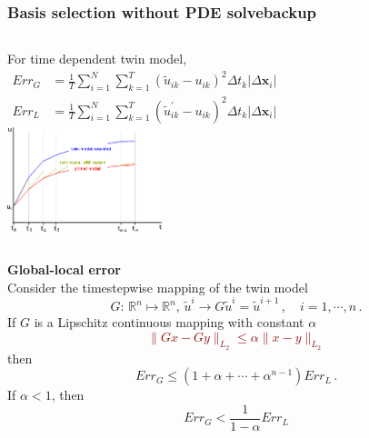 \documentclass{beamer}
\begin{document}
\begin{frame}
    \frametitle{Basis selection without PDE solve\hfill \scriptsize{backup}}\scriptsize
    \begin{columns}
            For time dependent twin model,
            \begin{equation*}\begin{split}
            Err_{G} &= 
            \frac{1}{T}\sum_{i=1}^{N}\sum_{k=1}^{T} \left(\tilde{u}_{ik} - u_{ik}\right)^2 \Delta t_k
            \left| \Delta \mathbf{x}_i \right|\\
            Err_{L} &= 
            \frac{1}{T}\sum_{i=1}^{N}\sum_{k=1}^{T} \left(\tilde{u}^\prime_{ik} - u_{ik}\right)^2 \Delta t_k
            \left| \Delta \mathbf{x}_i \right|
            \end{split}\end{equation*}
            \centering
            \includegraphics[width=4.5cm]{sketch2.png}
    \end{columns}
    \tiny
    \begin{theorem}
    \textbf{Global-local error}\\
    Consider the timestepwise mapping of the twin model
    \begin{equation*}
        G:\, \mathbb{R}^n\mapsto\mathbb{R}^n,\, \tilde{u}^i\rightarrow 
        G\tilde{u}^i = \tilde{u}^{i+1}\,,\quad i=1,\cdots, n\,.
    \end{equation*}
    If $G$ is a Lipschitz continuous mapping with constant $\alpha$
    \textcolor{darkred}{
    \begin{equation*}
        \|Gx-Gy\|_{L_2} \le \alpha \|x-y\|_{L_2}
    \end{equation*}
    }
    then
    \begin{equation*}
        Err_G \le (1+\alpha+\cdots+\alpha^{n-1}) Err_L\,.
    \end{equation*}
    If $\alpha < 1$, then
    \begin{equation*}
        Err_G < \frac{1}{1-\alpha}Err_L
    \end{equation*}
    \label{theorem: 1}
\end{theorem}
\end{frame}
\end{document}
